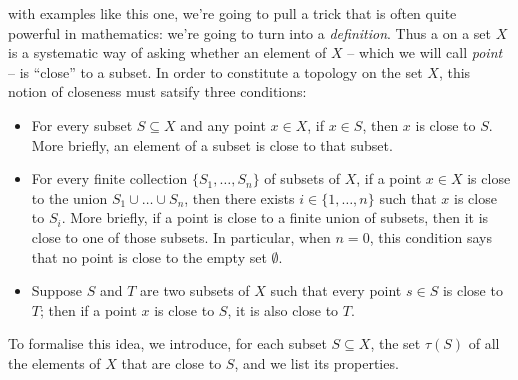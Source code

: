  with examples like this one, we're going to pull a trick that is often quite powerful in mathematics: we're going to turn  into a \emph{definition}.
Thus a  on a set $ X $ is a systematic way of asking whether an element of $ X $ -- which we will call \emph{point} -- is \enquote{close} to a subset.
In order to constitute a topology on the set $ X $, this notion of closeness must satsify three conditions:
\begin{itemize}
	\item For every subset $ S \subseteq X $ and any point $ x \in X$, if $ x \in S $, then $ x $ is close to $ S $.
		More briefly, an element of a subset is close to that subset.
	\item For every finite collection $ \{ S_1, \dots, S_n \} $ of subsets of $ X $, if a point $ x \in X $ is close to the union $ S_1 \cup \dots \cup S_n $, then there exists $ i \in \{ 1, \dots, n \} $ such that $ x $ is close to $ S_i $.
		More briefly, if a point is close to a finite union of subsets, then it is close to one of those subsets.
		In particular, when $ n = 0 $, this condition says that no point is close to the empty set $ \emptyset $.
	\item Suppose $ S $ and $ T $ are two subsets of $ X $ such that every point $ s \in S $ is close to $ T $;
		then if a point $ x $ is close to $ S $, it is also close to $ T $.
\end{itemize}
To formalise this idea, we introduce, for each subset $ S \subseteq X $, the set $ \tau(S) $ of all the elements of $ X $ that are close to $ S $, and we list its properties.

